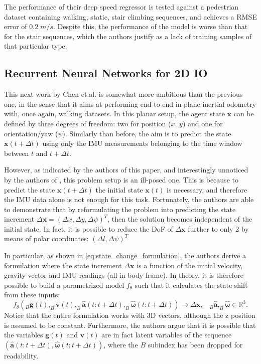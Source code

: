 The performance of their deep speed regressor is tested against a pedestrian dataset containing walking, static, stair climbing sequences, and achieves a RMSE error of $0.2\; m/s$.
Despite this, the performance of the model is worse than that for the stair sequences, which the authors justify as a lack of training samples of that particular type. 

\subsection{Recurrent Neural Networks for 2D IO}\label{sec:ionet}

This next work by Chen et.al. \cite{DBLP:journals/corr/abs-1802-02209} is somewhat more ambitious than the previous one, in the sense that it aims at performing end-to-end in-plane inertial odometry with, once again, walking datasets. 
In this planar setup, the agent state $\mathbf{x}$ can be defined by three degrees of freedom: two for position ($x$, $y$) and one for orientation/yaw ($\psi$). 
Similarly than before, the aim is to predict the state $\mathbf{x}(t+\Delta t)$ using only the IMU measurements belonging to the time window between $t$ and $t + \Delta t$.

However, as indicated by the authors of this paper, and interestingly unnoticed by the authors of \cite{DBLP:journals/corr/abs-1808-03485}, this problem setup is an ill-posed one.
This is because to predict the state $\mathbf{x}(t+\Delta t)$ the initial state $\mathbf{x}(t)$ is necessary, and therefore the IMU data alone is not enough for this task. 
Fortunately, the authors are able to demonstrate that by reformulating the problem into predicting the state increment $\Delta\mathbf{x} = (\Delta x, \Delta y, \Delta \psi)^{T}$, then the solution becomes independent of the initial state. 
In fact, it is possible to reduce the DoF of $\Delta\mathbf{x}$ further to only 2 by means of polar coordinates: $(\Delta l, \Delta \psi)^{T}$

In particular, as shown in \ref{eq:state_change_formulation}, the authors derive a formulation where the state increment $\Delta\mathbf{x}$ is a function of the initial velocity, gravity vector and IMU readings (all in body frame).
In theory, it is therefore possible to build a parametrized model $f_\theta$ such that it calculates the state shift from these inputs:
\begin{equation}\label{eq:state_change_formulation}
    f_\theta\left(_B\mathbf{g}(t), _{B}\mathbf{v}(t),_{B}\!\mathbf{\hat{a}}(t\!:\!t+\Delta t),_{B}\!\mathbf{\hat{\boldsymbol{\omega}}}(t\!:\!t+\Delta t)\right)\rightarrow\Delta\mathbf{x}, \;\;\;_{B}\mathbf{\hat{a}}, _{B}\!\mathbf{\hat{\boldsymbol{\omega}}}\in\mathbb{R}^3.
\end{equation}
Notice that the entire formulation works with 3D vectors, although the z position is assumed to be constant.
Furthermore, the authors argue that it is possible that the variables $\mathbf{g}(t)$ and $\mathbf{v}(t)$ are in fact latent variables of the sequence $\left(\mathbf{\hat{a}}(t\!:\!t+\Delta t),\mathbf{\hat{\boldsymbol{\omega}}}(t\!:\!t+\Delta t)\right)$, where the $B$ subindex has been dropped for readability. 

